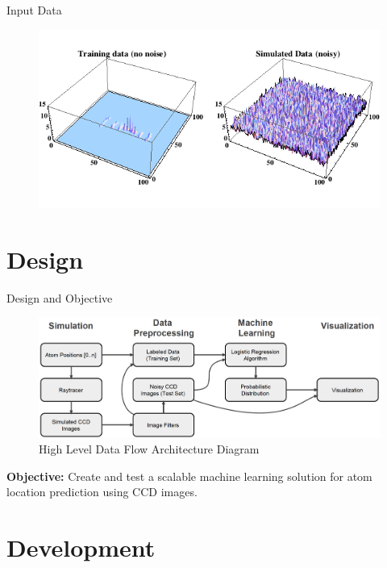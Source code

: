 \documentclass{beamer}
\begin{document}
\begin{frame}{Input Data}

\begin{figure}
  \centering
  \includegraphics[scale=0.57]{ccd3D.png}
\end{figure}

\end{frame}



\section{Design}

\begin{frame}{Design and Objective}

\begin{figure}[h]
\begin{center}
\includegraphics[scale=0.32]{arch.png}
\caption{High Level Data Flow Architecture Diagram}
\label{fig:small}
\end{center}
\end{figure}

\textbf{Objective:} Create and test a scalable machine learning solution for atom location prediction using CCD images.

\end{frame}


\section{Development}
\end{document}
